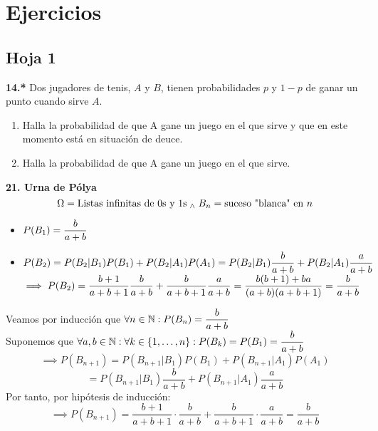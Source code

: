 \section{Ejercicios}
\subsection{Hoja 1}

\noindent \textbf{14.*} Dos jugadores de tenis, $A$ y $B$, tienen probabilidades $p$ y $1-p$ de ganar un punto cuando sirve $A$.
\begin{enumerate}
    \item Halla la probabilidad de que A gane un juego en el que sirve y que en este momento está en situación de deuce.
    \item Halla la probabilidad de que A gane un juego en el que sirve.
\end{enumerate}

\noindent \textbf{21. Urna de Pólya}
\[\Omega= \text{Listas infinitas de $0$s y $1$s} \; _{\wedge} \; B_n=\text{suceso "blanca" en }n\]
\begin{itemize}%
    \item $\displaystyle P(B_1)=\frac{b}{a+b}$
    \item $\displaystyle P(B_2)=P(B_2|B_1)P(B_1)+P(B_2|A_1)P(A_1)=P(B_2|B_1)\frac{b}{a+b}+P(B_2|A_1)\frac{a}{a+b}$ \\
    $\displaystyle \implies P(B_2)=\frac{b+1}{a+b+1}\frac{b}{a+b}+\frac{b}{a+b+1}\frac{a}{a+b}=\frac{b(b+1)+ba}{(a+b)(a+b+1)}=\frac{b}{a+b}$
\end{itemize}
\begin{dem}
    Veamos por inducción que $\displaystyle \forall n \in \mathbb{N} :P(B_n)=\frac{b}{a+b}$ \\
    Suponemos que $\displaystyle \forall a,b \in \mathbb{N}: \forall k \in \{1, \dots, n\}:P(B_k)=P(B_1)=\frac{b}{a+b}$
    \[\implies P(B_{n+1})=P(B_{n+1}|B_1)P(B_1)+P(B_{n+1}|A_1)P(A_1)\]
    \[=P(B_{n+1}|B_1)\frac{b}{a+b}+P(B_{n+1}|A_1)\frac{a}{a+b}\]
    Por tanto, por hipótesis de inducción:
    \[\implies P(B_{n+1})=\frac{b+1}{a+b+1}\cdot\frac{b}{a+b} + \frac{b}{a+b+1}\cdot\frac{a}{a+b}=\frac{b}{a+b}\]
\end{dem}